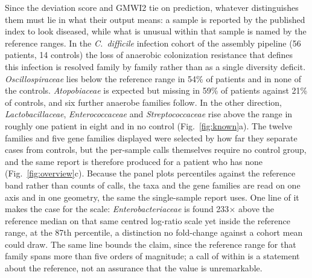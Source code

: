 \documentclass[conference]{IEEEtran}
\newcommand{\cdiff}{\textit{C.~difficile}}
\begin{document}
Since the deviation score and GMWI2 tie on prediction, whatever distinguishes them must lie in what their output means: a sample is reported by the published index to look diseased, while what is unusual within that sample is named by the reference ranges. In the \cdiff{} infection cohort of the assembly pipeline (56 patients, 14 controls) the loss of anaerobic colonization resistance that defines this infection is resolved family by family rather than as a single diversity deficit. \textit{Oscillospiraceae} lies below the reference range in 54\% of patients and in none of the controls. \textit{Atopobiaceae} is expected but missing in 59\% of patients against 21\% of controls, and six further anaerobe families follow. In the other direction, \textit{Lactobacillaceae}, \textit{Enterococcaceae} and \textit{Streptococcaceae} rise above the range in roughly one patient in eight and in no control (Fig.~\ref{fig:known}a). The twelve families and five gene families displayed were selected by how far they separate cases from controls, but the per-sample calls themselves require no control group, and the same report is therefore produced for a patient who has none (Fig.~\ref{fig:overview}c). Because the panel plots percentiles against the reference band rather than counts of calls, the taxa and the gene families are read on one axis and in one geometry, the same the single-sample report uses. One line of it makes the case for the scale: \textit{Enterobacteriaceae} is found 233$\times$ above the reference median on that same centred log-ratio scale yet inside the reference range, at the 87th percentile, a distinction no fold-change against a cohort mean could draw. The same line bounds the claim, since the reference range for that family spans more than five orders of magnitude; a call of within is a statement about the reference, not an assurance that the value is unremarkable.
\end{document}
